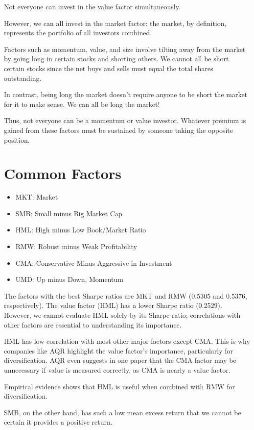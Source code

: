 \documentclass{article}
\begin{document}
Not everyone can invest in the value factor simultaneously.

However, we can all invest in the market factor: the market, by definition, represents the portfolio of all investors combined.

Factors such as momentum, value, and size involve tilting away from the market by going long in certain stocks and shorting others. We cannot all be short certain stocks since the net buys and sells must equal the total shares outstanding.

In contrast, being long the market doesn't require anyone to be short the market for it to make sense. We can all be long the market!

Thus, not everyone can be a momentum or value investor. Whatever premium is gained from these factors must be sustained by someone taking the opposite position.

\section{Common Factors}
\begin{itemize}
    \item MKT: Market
    \item SMB: Small minus Big Market Cap
    \item HML: High minus Low Book/Market Ratio
    \item RMW: Robust minus Weak Profitability
    \item CMA: Conservative Minus Aggressive in Investment
    \item UMD: Up minus Down, Momentum
\end{itemize}

The factors with the best Sharpe ratios are MKT and RMW (0.5305 and 0.5376, respectively). The value factor (HML) has a lower Sharpe ratio (0.2529). However, we cannot evaluate HML solely by its Sharpe ratio; correlations with other factors are essential to understanding its importance.

HML has low correlation with most other major factors except CMA. This is why companies like AQR highlight the value factor's importance, particularly for diversification. AQR even suggests in one paper that the CMA factor may be unnecessary if value is measured correctly, as CMA is nearly a value factor.

Empirical evidence shows that HML is useful when combined with RMW for diversification.

SMB, on the other hand, has such a low mean excess return that we cannot be certain it provides a positive return.
\end{document}
